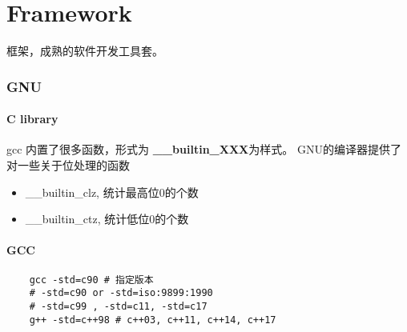 \clearpage
\part{Framework}
框架，成熟的软件开发工具套。

\section{GNU}

\subsection{C library}
gcc 内置了很多函数，形式为 \textbf{ \_\_builtin\_XXX}为样式。
GNU的编译器提供了对一些关于位处理的函数
\begin{itemize}
    \item { \_\_builtin\_clz, 统计最高位0的个数 }
    \item { \_\_builtin\_ctz, 统计低位0的个数}
\end{itemize}

\subsection{GCC}

\begin{lstlisting}
    gcc -std=c90 # 指定版本
    # -std=c90 or -std=iso:9899:1990
    # -std=c99 , -std=c11, -std=c17
    g++ -std=c++98 # c++03, c++11, c++14, c++17
\end{lstlisting}

